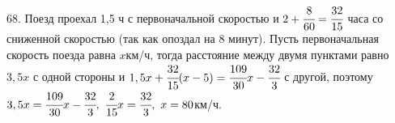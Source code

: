 68. Поезд проехал 1,5 ч с первоначальной скоростью и $2+\cfrac{8}{60}=\cfrac{32}{15}$ часа со сниженной скоростью (так как опоздал на 8 минут). Пусть первоначальная скорость поезда равна $x$км/ч, тогда расстояние между двумя пунктами равно $3,5x$ с одной стороны и  $1,5x+\cfrac{32}{15}(x-5)=\cfrac{109}{30}x-\cfrac{32}{3}$ с другой, поэтому $3,5x=\cfrac{109}{30}x-\cfrac{32}{3},\ \cfrac{2}{15}x=\cfrac{32}{3},\ x=80$км/ч.\\
